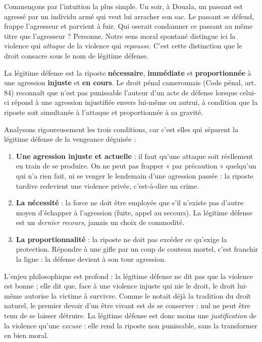 \documentclass[11pt]{article}
\newcommand{\cle}[1]{{\popxbold\color{popdark}#1}}
\newcounter{popsec}
\newcounter{popsub}
\newcommand{\courssub}[1]{%
  \stepcounter{popsub}%
  \par\vspace{9pt}\noindent{\popxbold\fontsize{11.5}{13}\selectfont\color{popink}{\color{poporange}\thepopsec.\thepopsub}\hspace{6pt}#1}\par\nopagebreak\vspace{4pt}
}
\begin{document}
\courssub{L'hypothèse de la légitime défense}

Commençons par l'intuition la plus simple. Un soir, à Douala, un passant est agressé par un individu armé qui veut lui arracher son sac. Le passant se défend, frappe l'agresseur et parvient à fuir. Qui oserait condamner ce passant au même titre que l'agresseur ? Personne. Notre sens moral spontané distingue ici la violence qui \emph{attaque} de la violence qui \emph{repousse}. C'est cette distinction que le droit consacre sous le nom de \cle{légitime défense}.

\begin{definition}
La \cle{légitime défense} est la riposte \textbf{nécessaire}, \textbf{immédiate} et \textbf{proportionnée} à une agression \textbf{injuste} et \textbf{en cours}. Le droit pénal camerounais (Code pénal, art. 84) reconnaît que n'est pas punissable l'auteur d'un acte de défense lorsque celui-ci répond à une agression injustifiée envers lui-même ou autrui, à condition que la riposte soit simultanée à l'attaque et proportionnée à sa gravité.
\end{definition}

Analysons rigoureusement les trois conditions, car c'est elles qui séparent la légitime défense de la vengeance déguisée :

\begin{enumerate}
\item \textbf{Une agression injuste et actuelle} : il faut qu'une attaque soit réellement en train de se produire. On ne peut pas frapper « par précaution » quelqu'un qui n'a rien fait, ni se venger le lendemain d'une agression passée : la riposte tardive redevient une violence privée, c'est-à-dire un crime.
\item \textbf{La nécessité} : la force ne doit être employée que s'il n'existe pas d'autre moyen d'échapper à l'agression (fuite, appel au secours). La légitime défense est un \emph{dernier recours}, jamais un choix de commodité.
\item \textbf{La proportionnalité} : la riposte ne doit pas excéder ce qu'exige la protection. Répondre à une gifle par un coup de couteau mortel, c'est franchir la ligne : la défense devient à son tour agression.
\end{enumerate}

L'enjeu philosophique est profond : la légitime défense ne dit pas que la violence est bonne ; elle dit que, face à une violence injuste qui nie le droit, le droit lui-même autorise la victime à survivre. Comme le notait déjà la tradition du droit naturel, le premier devoir d'un être vivant est de se conserver : nul ne peut être tenu de se laisser détruire. La légitime défense est donc moins une \emph{justification} de la violence qu'une \emph{excuse} : elle rend la riposte non punissable, sans la transformer en bien moral.
\end{document}
